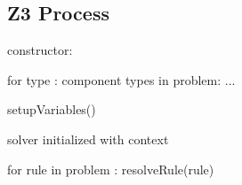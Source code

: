 \subsection{Z3 Process}

constructor:

for type : component types in problem:
	...
	
setupVariables()

solver initialized with context

for rule in problem :
	resolveRule(rule)